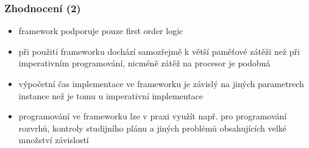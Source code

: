 \documentclass[czech]{beamer}
\begin{document}
\begin{frame}
  \frametitle{Zhodnocení (2)}
  \begin{itemize}  
  
  \item<1-> framework podporuje pouze first order logic
  \item<2-> při použití frameworku dochází samozřejmě k větší paměťové zátěži
  než při imperativním programování, nicméně zátěž na procesor je podobná
  \item<3-> výpočetní čas implementace ve frameworku je závislý na jiných
  parametrech instance než je tomu u imperativní implementace
  \item<4-> programování ve frameworku lze v praxi využít např. pro programování
  rozvrhů, kontroly studijního plánu a jiných problémů obsahujících velké
  množství závislostí
  \end{itemize}
  \end{frame}





\end{document}
